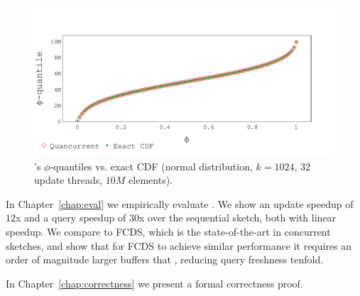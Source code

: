 \begin{figure}[htp]
    \centering
    \includegraphics[width=\linewidth,trim={0cm 0.3cm 0cm 1.5cm},clip]
    {graphics/graphs/accuracy/Oracle_Quancurrent_blocking_numa_cdf_normal_k1024_b16_keys10M_runs1_uT32_qT1_snapshot1_17-09-2022_07-00-49.pdf}
    \caption{\mysketch's $\phi$-quantiles vs. exact CDF (normal distribution, $k=1024$, $32$ update threads, $10M$ elements).}
    \label{fig:intro-query-accuracy}
\end{figure}


In Chapter~\ref{chap:eval} we empirically evaluate \mysketch. We show an update speedup of $12$x and a query speedup of $30$x over the sequential sketch, both with linear speedup. We compare \mysketch to FCDS, which is the state-of-the-art in concurrent sketches, and show that for FCDS to achieve similar performance it requires an order of magnitude larger buffers that \mysketch, reducing query freshness tenfold.

In Chapter~\ref{chap:correctness} we present a formal correctness proof. 


